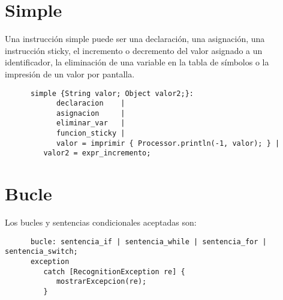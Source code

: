    \section{Simple}
   Una instrucción simple puede ser una declaración, una asignación, una instrucción sticky, el incremento o decremento del valor 
   asignado a un identificador, la eliminación de una variable en la tabla de símbolos o la impresión de un valor por pantalla.
   \begin{lstlisting}
      simple {String valor; Object valor2;}:  
            declaracion    | 
            asignacion     | 
            eliminar_var   | 
            funcion_sticky | 
            valor = imprimir { Processor.println(-1, valor); } | 
         valor2 = expr_incremento;
   \end{lstlisting}

   \section{Bucle}
   Los bucles y sentencias condicionales aceptadas son:
   \begin{lstlisting}
      bucle: sentencia_if | sentencia_while | sentencia_for | sentencia_switch;
      exception
         catch [RecognitionException re] {
            mostrarExcepcion(re);
         }
   \end{lstlisting}

